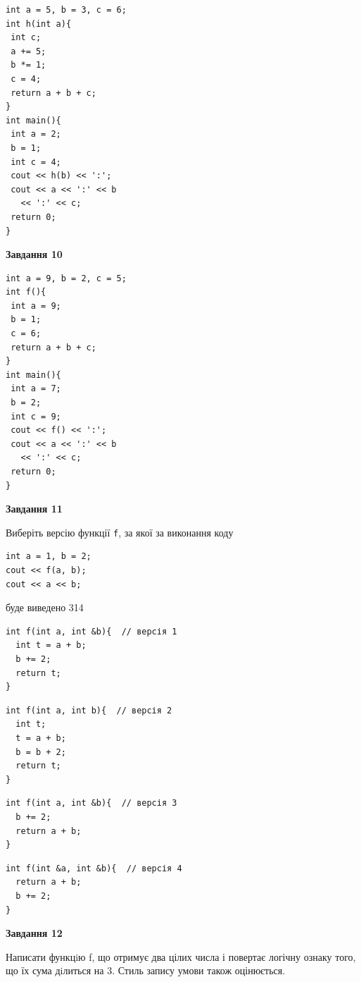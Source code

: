 \documentclass[12pt, ukrainian]{article}
\def\code#1{\Verb!#1!}
\begin{document}
{\begin {large}
\begin{minipage}[t]{7.0cm}
\begin{verbatim}
int a = 5, b = 3, c = 6;
int h(int a){
 int c;
 a += 5;
 b *= 1;
 c = 4;
 return a + b + c;
}
int main(){
 int a = 2;
 b = 1;
 int c = 4;
 cout << h(b) << ':';
 cout << a << ':' << b 
   << ':' << c;
 return 0;
}
\end{verbatim}



\begin{center}
\textbf{Завдання 10}
\end{center}
\vspace{-8mm}

\begin{verbatim}
int a = 9, b = 2, c = 5;
int f(){
 int a = 9;
 b = 1;
 c = 6;
 return a + b + c;
}
int main(){
 int a = 7;
 b = 2;
 int c = 9;
 cout << f() << ':';
 cout << a << ':' << b 
   << ':' << c;
 return 0;
}
\end{verbatim}

\end{minipage}
\vline \hspace{1mm}
\begin{minipage}[t]{11.0cm}

\begin{center}
\textbf{Завдання 11}
\end{center}
Виберіть версію функції \code{f}, за якої за виконання коду
\begin{verbatim}
int a = 1, b = 2;
cout << f(a, b);
cout << a << b;
\end{verbatim}

буде виведено 314

\begin{verbatim}
int f(int a, int &b){  // версія 1
  int t = a + b;
  b += 2;
  return t;
}
\end{verbatim}

\vspace{-8mm}\begin{verbatim}
int f(int a, int b){  // версія 2
  int t;
  t = a + b;
  b = b + 2;
  return t;
}
\end{verbatim}

\vspace{-8mm}\begin{verbatim}
int f(int a, int &b){  // версія 3
  b += 2;
  return a + b;
}
\end{verbatim}

\vspace{-8mm}\begin{verbatim}
int f(int &a, int &b){  // версія 4
  return a + b;
  b += 2;
}
\end{verbatim}



\begin{center}
\textbf{Завдання 12}
\end{center}

Написати функцiю f, що отримує два цілих числа і повертає логічну ознаку того, що їх сума дiлиться на 3. Стиль запису умови також оцінюється.\par

\end{minipage}

\end {large}}
\end{document}

